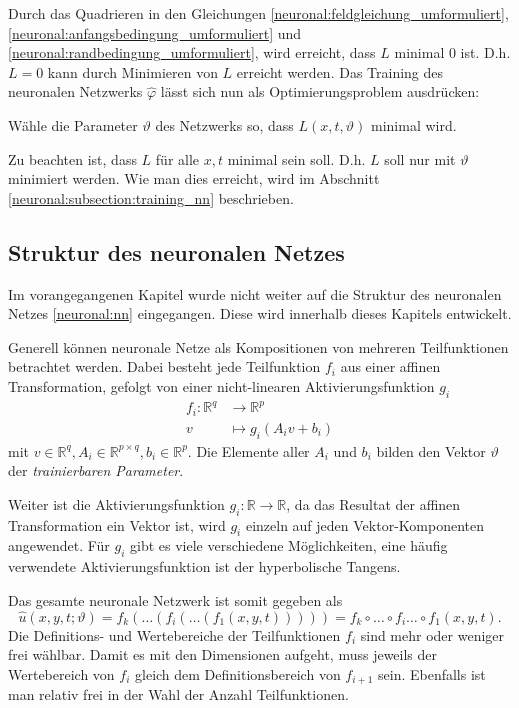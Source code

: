 Durch das Quadrieren in den Gleichungen \eqref{neuronal:feldgleichung_umformuliert}, \eqref{neuronal:anfangsbedingung_umformuliert} und \eqref{neuronal:randbedingung_umformuliert}, wird erreicht, dass \( L \) minimal 0 ist.
D.h. \( L = 0 \) kann durch Minimieren von \( L \) erreicht werden.
Das Training des neuronalen Netzwerks \( \hat{\varphi} \) lässt sich nun als Optimierungsproblem ausdrücken:
\begin{aufgabe}
Wähle die Parameter \( \vartheta \) des Netzwerks so, dass \( L(x, t, \vartheta) \) minimal wird.
\end{aufgabe}
Zu beachten ist, dass \( L \) für alle \( x, t \) minimal sein soll.
D.h. \( L \) soll nur mit \( \vartheta \) minimiert werden.
Wie man dies erreicht, wird im Abschnitt \ref{neuronal:subsection:training_nn} beschrieben.

\subsection{Struktur des neuronalen Netzes}\label{neuronal:subsection:struktur_nn}

Im vorangegangenen Kapitel wurde nicht weiter auf die Struktur des neuronalen Netzes \eqref{neuronal:nn} eingegangen.
Diese wird innerhalb dieses Kapitels entwickelt.

Generell können neuronale Netze als Kompositionen von mehreren Teilfunktionen betrachtet werden.
Dabei besteht jede Teilfunktion \( f_i \) aus einer affinen Transformation, gefolgt von einer nicht-linearen Aktivierungsfunktion \( g_i \)
\begin{align*}
    f_i\colon \mathbb{R}^q & \longrightarrow\mathbb{R}^p \\[-1ex]
    v & \longmapsto g_i(A_iv + b_i)
\end{align*}
mit \( v \in \mathbb{R}^q, A_i \in \mathbb{R}^{p \times q}, b_i \in \mathbb{R}^p \). 
Die Elemente aller \( A_i \) und \( b_i \) bilden den Vektor \( \vartheta \) der \emph{trainierbaren Parameter}.

Weiter ist die Aktivierungsfunktion \( g_i\colon \mathbb{R} \longrightarrow\mathbb{R} \), da das Resultat der affinen Transformation ein Vektor ist, wird \( g_i \) einzeln auf jeden Vektor-Komponenten angewendet.
Für \( g_i \) gibt es viele verschiedene Möglichkeiten, eine häufig verwendete Aktivierungsfunktion ist der hyperbolische Tangens.

Das gesamte neuronale Netzwerk ist somit gegeben als
\begin{equation}
    \hat{u}(x, y, t; \vartheta) = f_k(\ldots(f_i(\ldots(f_1(x, y, t))))) = f_k \circ \ldots \circ f_i \ldots \circ f_1(x, y, t).
    \label{neuronal:nn_ausformuliert}
\end{equation}
Die Definitions- und Wertebereiche der Teilfunktionen \( f_i \) sind mehr oder weniger frei wählbar.
Damit es mit den Dimensionen aufgeht, muss jeweils der Wertebereich von \( f_i \) gleich dem Definitionsbereich von \( f_{i+1} \) sein.
Ebenfalls ist man relativ frei in der Wahl der Anzahl Teilfunktionen.

